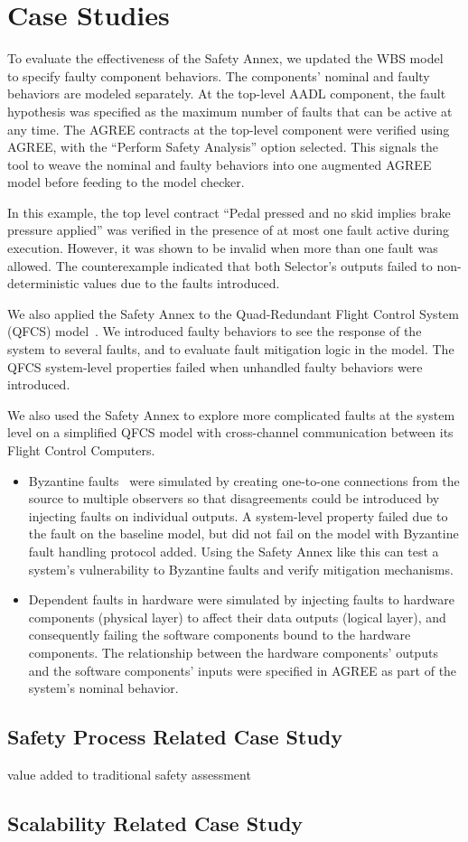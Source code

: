 \section{Case Studies}
\label{sec:case_study}

To evaluate the effectiveness of the Safety Annex, we updated the WBS model~\cite{Stewart17:IMBSA} to specify faulty component behaviors. The components' nominal  and faulty behaviors are modeled separately. At the top-level AADL component, the fault hypothesis was specified as the maximum number of faults that can be active at any time. The AGREE contracts at the top-level component were verified using AGREE, with the ``Perform Safety Analysis'' option selected. This signals the tool to weave the nominal and faulty behaviors into one augmented AGREE model before feeding to the model checker.

In this example, the top level contract ``Pedal pressed and no skid implies brake pressure applied'' was verified in the presence of at most one fault active during execution.  However, it was shown to be invalid when more than one fault was allowed. The counterexample indicated that both Selector's outputs failed to non-deterministic values due to the faults introduced.

We also applied the Safety Annex to the Quad-Redundant Flight Control System (QFCS) model~\cite{QFCS15:backes}.  We introduced faulty behaviors to see the response of the system to several faults, and to evaluate fault mitigation logic in the model.  The QFCS system-level properties failed when unhandled faulty behaviors were introduced.

We also used the Safety Annex to explore more complicated faults at the system level on a simplified QFCS model with cross-channel communication between its Flight Control Computers.

\begin{itemize} 
	\item Byzantine faults~\cite{Driscoll-Byzantine-Fault} were simulated by creating one-to-one connections from the source to multiple observers so that disagreements could be introduced by injecting faults on individual outputs. A system-level property failed due to the fault on the baseline model, but did not fail on the model with Byzantine fault handling protocol added. Using the Safety Annex like this can test a system's vulnerability to Byzantine faults and verify mitigation mechanisms.
	
	\item Dependent faults in hardware were simulated by injecting faults to hardware components (physical layer) to affect their data outputs (logical layer), and consequently failing the software components bound to the hardware components. The relationship between the hardware components' outputs and the software components' inputs were specified in AGREE as part of the system's nominal behavior.	
\end{itemize}

\subsection{Safety Process Related Case Study}
value added to traditional safety assessment

\subsection{Scalability Related Case Study}
